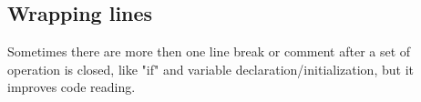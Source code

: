 \subsection{Wrapping lines}

Sometimes there are more then one line break or comment after a set of operation is closed,
like "if" and variable declaration/initialization, but it improves code reading.
